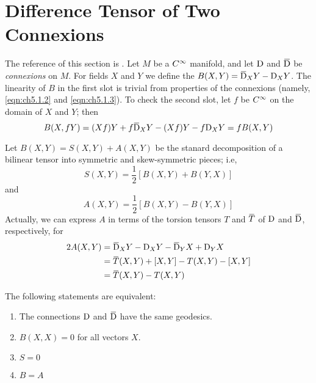 \documentclass[../main]{subfiles}
\begin{document}
\section{Difference Tensor of Two Connexions}\label{ch05:s4}

The reference of this section is \cite{ambrose1960sprays}. Let $M$ be a $C^\infty$ manifold, and let $\mathrm{D}$ and $\covariant$ be \emph{connexions} on $M$. For fields $X$ and $Y$ we define the  $B(X,Y)=\covariant_X Y - \connection_X Y $. The linearity of $B$ in the first slot is trivial from properties of the connexions (namely, \ref{eqn:ch5.1.2} and \ref{eqn:ch5.1.3}). To check the second slot, let $f$ be $C^\infty$ on the domain of $X$ and $Y$; then \[B(X,fY) = (Xf)Y+f\covariant_XY-(Xf)Y -f\connection_X Y = f B(X,Y)\]

Let $B(X,Y)= S(X,Y)+A(X,Y)$ be the stanard decomposition of a bilinear tensor into symmetric and skew-symmetric pieces; i.e,
\[S(X,Y) = \dfrac{1}{2} [B(X,Y)+B(Y,X)]\]
and
\[A(X,Y) = \dfrac{1}{2} [B(X,Y)-B(Y,X)]\]
Actually, we can express $A$ in terms of the torsion tensors $T$ and $\xoverline{T}$ of $\mathrm{D}$ and $\covariant$, respectively, for 
\begin{align*}
    2A(X,Y) &= \covariant_XY-\connection_XY-\covariant_YX+\connection_YX \\
            &= \xoverline{T}(X,Y) +[X,Y] -T(X,Y)-[X,Y]\\
            &= \xoverline{T}(X,Y) - T(X,Y)
\end{align*}



\begin{theorem} \label{thm:ch5.4.1}
The following statements are equivalent:
\begin{enumerate}[label = (\alph*)]
    \item The connections $\mathrm{D}$ and $\covariant$ have the same geodesics.
    \item $B(X,X)=0$ for all vectors $X$.
    \item $S=0$
    \item $B=A$
\end{enumerate}
\end{theorem}
\end{document}
